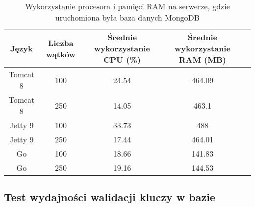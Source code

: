 \begin{table}[!htb]
\centering
\caption{Wykorzystanie procesora i pamięci RAM na serwerze, gdzie uruchomiona była baza danych MongoDB}
\label{tab:mongo-full-api}
\begin{tabular}{@{}ccccl@{}}
\toprule
\textbf{Język} & \textbf{Liczba wątków} & \multicolumn{1}{p{3cm}}{\textbf{Średnie wykorzystanie CPU (\%)}} & \multicolumn{1}{p{3cm}}{\textbf{Średnie wykorzystanie RAM (MB)}} &  \\ \midrule
Tomcat 8       & 100                    & 24.54                             & 464.09                          &  \\
Tomcat 8       & 250                    & 14.05                             & 463.1                          &  \\
Jetty 9       & 100                    & 33.73                             & 488                          &  \\
Jetty 9       & 250                    & 17.44                             & 464.01                          &  \\
Go       & 100                    & 18.66                             & 141.83                          &  \\
Go       & 250                    & 19.16                             & 144.53                          &  \\
\bottomrule
\end{tabular}
\end{table}

 \newpage
 \subsection{Test wydajności walidacji kluczy w bazie}

 \clearpage

